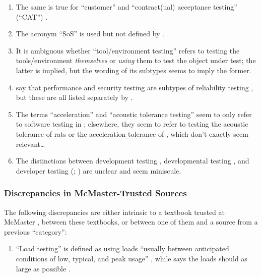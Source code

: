 \begin{enumerate}[resume]
            acronym: ``HIL''\footnote{``HiL'' is used for the former by
                  \citet[p.~2]{PreußeEtAl2012}.} \citep[p.~23]{Firesmith2015}.
      \item The same is true for ``customer'' and ``contract(ual) acceptance
            testing'' (``CAT'') \citep[p.~30]{Firesmith2015}.
      \item The acronym ``SoS'' is used but not defined by
            \citet[p.~23]{Firesmith2015}.
      \item It is ambiguous whether ``tool/environment testing'' refers to
            testing the tools/environment \emph{themselves} or \emph{using}
            them to test the object under test; the latter is implied, but the
            wording of its subtypes \citep[p.~25]{Firesmith2015} seems to imply
            the former.
      \item \citeauthor{ISO_IEC2023a} say that performance and security testing
            are subtypes of reliability testing \citeyearpar{ISO_IEC2023a}, but
            these are all listed separately by \citet[p.~53]{Firesmith2015}.
      \item The terms ``acceleration'' and ``acoustic tolerance testing'' seem
            to only refer to software testing in \citep[p.~56]{Firesmith2015};
            elsewhere, they seem to refer to testing the acoustic tolerance of
            rats \citep{HolleyEtAl1996} or the acceleration tolerance of
            \accelTolTest{}, which don't exactly seem relevant\dots
      \item The distinctions between development testing \citep[p.~136]{IEEE2017},
            developmental testing \citep[p.~30]{Firesmith2015}, and developer
            testing (\citealp[p.~39]{Firesmith2015}; \citealp[p.~11]{Gerrard2000a})
            are unclear and seem miniscule.
\end{enumerate}

\subsubsection{Discrepancies in McMaster-Trusted Sources}

The following discrepancies are either intrinsic to a textbook trusted at
McMaster \citep{Patton2006, PetersAndPedrycz2000, vanVliet2000}, between these
textbooks, or between one of them and a source from a previous ``category'':

\begin{enumerate}[resume]
      \item ``Load testing'' is defined as using loads ``usually between
            anticipated conditions of low, typical, and peak usage''
            \citep[p.~5]{IEEE2022}, while \citeauthor{Patton2006} says the
            loads should as large as possible \citeyearpar[p.~86]{Patton2006}.
\end{enumerate}

